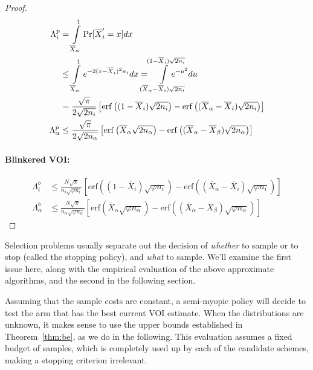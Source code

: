 \begin{proof}

\begin{align}
\Lambda_i^p&=\int\limits_{\overline X_\alpha}^1\Pr[\overline X_i'=x]dx\nonumber\\
&\le \int\limits_{\overline X_\alpha}^1e^{-2(x-\overline X_i)^2n_i}dx
=\hspace{-1em}\int\limits_{(\overline X_\alpha - \overline X_i)\sqrt{2n_i}}^{(1- \overline X_i)\sqrt{2n_i}}\hspace{-2em}e^{-u^2}du\nonumber\\
&=\frac {\sqrt \pi} {2 \sqrt {2n_i}}
  \left[\mathrm{erf}\left((1-\overline X_i)\sqrt {2n_i}\right)
      -\mathrm{erf}\left((\overline X_\alpha - \overline X_i)\sqrt{2n_i}\right)\right]\nonumber\\
\Lambda_\alpha^p&\le\frac {\sqrt \pi} {2 \sqrt {2n_\alpha}}
  \left[\mathrm{erf}\left(\overline X_\alpha\sqrt {2n_\alpha}\right)
      -\mathrm{erf}\left((\overline X_\alpha - \overline X_\beta)\sqrt{2n_\alpha}\right)\right]
\label{eqn:erf-perfect}
\end{align}

\paragraph{Blinkered VOI:} 

\begin{align}
\Lambda_i^b&\le\frac {N\sqrt \pi} {n_i \sqrt {\varphi n_i}}
  \left[\mathrm{erf}\left((1-\overline X_i)\sqrt {\varphi n_i}\right)
      -\mathrm{erf}\left((\overline X_\alpha - \overline X_i)\sqrt{\varphi n_i}\right)\right]\nonumber\\
\Lambda_\alpha^b&\le\frac {N\sqrt \pi} {n_\alpha \sqrt {\varphi n_\alpha}}
  \left[\mathrm{erf}\left(\overline X_\alpha\sqrt {\varphi n_\alpha}\right)
      -\mathrm{erf}\left((\overline X_\alpha - \overline X_\beta)\sqrt{\varphi n_\alpha}\right)\right]
\label{eqn:erf-blinkered}
\end{align}

\end{proof}



Selection problems usually separate out the decision of {\em whether} to
sample or to stop (called the stopping policy), and {\em what} to sample.
We'll examine the first issue here, along with the empirical evaluation 
of the above approximate algorithms, and the second in the following section.

Assuming that the sample costs are constant,
a semi-myopic policy will decide to test the arm that has the best
current VOI estimate. 
When the distributions are unknown, it makes sense
to use the upper bounds established in Theorem~\ref{thm:be}, as we do in the following.
This evaluation assumes a fixed budget of samples, which is
completely used up by each of the candidate schemes, making a stopping
criterion irrelevant.


